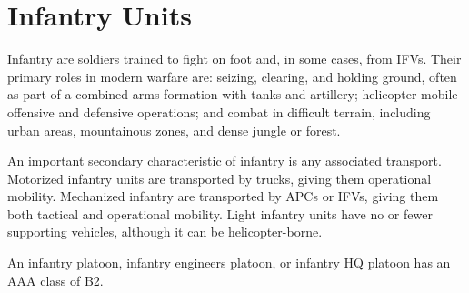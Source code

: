 
\section{Infantry Units}

Infantry are soldiers trained to fight on foot and, in some cases, from IFVs.
Their primary roles in modern warfare are: seizing, clearing, and holding ground, often as part of a combined-arms formation with tanks and artillery; helicopter-mobile offensive and defensive operations; and combat in difficult terrain, including urban areas, mountainous zones, and dense jungle or forest.

An important secondary characteristic of infantry is any associated transport.
Motorized infantry units are transported by trucks, giving them operational mobility.
Mechanized infantry are transported by APCs or IFVs, giving them both tactical and operational mobility.
Light infantry units have no or fewer supporting vehicles, although it can be helicopter-borne.

An infantry platoon, infantry engineers platoon, or infantry HQ platoon has an AAA class of B2.

